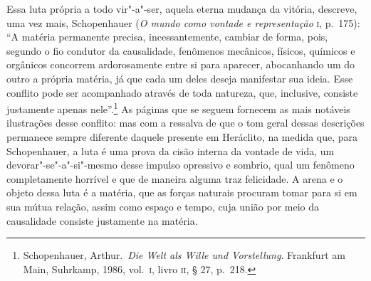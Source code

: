 Essa luta própria a todo vir"-a"-ser, aquela eterna mudança da vitória,
descreve, uma vez mais, Schopenhauer (\textit{O mundo como vontade e
representação} \textsc{i}, p.~175): ``A matéria permanente precisa,
incessantemente, cambiar de forma, pois, segundo o fio condutor da
causalidade, fenômenos mecânicos, físicos, químicos e orgânicos
concorrem ardorosamente entre si para aparecer, abocanhando um do outro
a própria matéria, já que cada um deles deseja manifestar sua ideia.
Esse conflito pode ser acompanhado através de toda natureza, que,
inclusive, consiste justamente apenas nele''.\footnote{ Schopenhauer,
Arthur.~\textit{Die Welt als Wille und Vorstellung}. Frankfurt am Main,
Suhrkamp, 1986, vol.~\textsc{i}, livro \textsc{ii}, § 27, p.~218.} As páginas que se
seguem fornecem as mais notáveis ilustrações desse conflito: mas com a
ressalva de que o tom geral dessas descrições permanece sempre
diferente daquele presente em Heráclito, na medida que, para
Schopenhauer, a luta é uma prova da cisão interna da vontade de vida,
um devorar"-se"-a"-si"-mesmo desse impulso opressivo e sombrio, qual um
fenômeno completamente horrível e que de maneira alguma traz
felicidade. A arena e o objeto dessa luta é a matéria, que as forças
naturais procuram tomar para si em sua mútua relação, assim como espaço
e tempo, cuja união por meio da causalidade consiste justamente na matéria. 

\sectionitem

